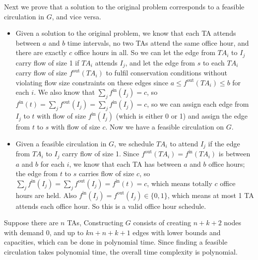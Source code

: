 \documentclass[12pt,letterpaper]{article}
\begin{document}
Next we prove that a solution to the original problem corresponds to a feasible circulation in $G$, and vice versa.
\begin{itemize}
\item Given a solution to the original problem, we know that each TA attends between $a$ and $b$ time intervals, no two TAs attend the same office hour, and there are exactly $c$ office hours in all. So we can let the edge from $TA_i$ to $I_j$ carry flow of size 1 if $TA_i$ attends $I_j$, and let the edge from $s$ to each $TA_i$ carry flow of size $f^{\textrm{out}}(TA_i)$ to fulfil conservation conditions without violating flow size constraints on these edges since $a\le f^{\textrm{out}}(TA_i)\le b$ for each $i$. We also know that $\sum_{j}f^{\textrm{in}}(I_j)=c$, so $f^{\textrm{in}}(t)=\sum_{j}f^{\textrm{out}}(I_j)=\sum_{j}f^{\textrm{in}}(I_j)=c$, so we can assign each edge from $I_j$ to $t$ with flow of size $f^{\textrm{in}}(I_j)$ (which is either 0 or 1) and assign the edge from $t$ to $s$ with flow of size $c$. Now we have a feasible circulation on $G$.
\item Given a feasible circulation in $G$, we schedule $TA_i$ to attend $I_j$ if the edge from $TA_i$ to $I_j$ carry flow of size 1. Since $f^{\textrm{out}}(TA_i)=f^{\textrm{in}}(TA_i)$ is between $a$ and $b$ for each $i$, we know that each TA has between $a$ and $b$ office hours; the edge from $t$ to $s$ carries flow of size $c$, so $\sum_{j}f^{\textrm{in}}(I_j)=\sum_{j}f^{\textrm{out}}(I_j)=f^{\textrm{in}}(t)=c$, which means totally $c$ office hours are held. Also $f^{\textrm{in}}(I_j)=f^{\textrm{out}}(I_j)\in \{0,1\}$, which means at most 1 TA attends each office hour. So this is a valid office hour schedule.
\end{itemize}

Suppose there are $n$ TAs, Constructing $G$ consists of creating $n+k+2$ nodes with demand 0, and up to $kn+n+k+1$ edges with lower bounds and capacities, which can be done in polynomial time. Since finding a feasible circulation takes polynomial time, the overall time complexity is polynomial.
\end{document}
